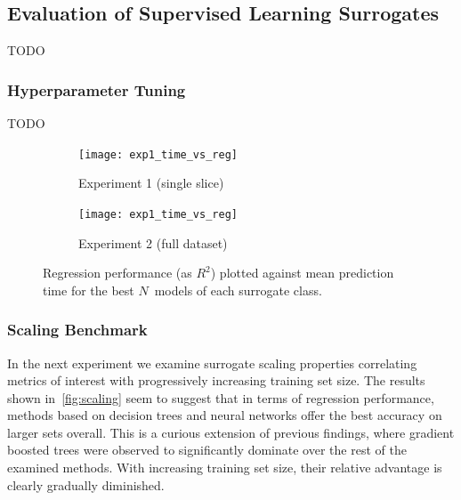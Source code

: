 \subsection{Evaluation of Supervised Learning Surrogates}
\label{sec:modelres}

TODO

\subsubsection{Hyperparameter Tuning}

TODO

\begin{figure}[h]
	\centering
	\begin{subfigure}[b]{0.5\textwidth}
		\centering
		\texttt{[image: exp1\_time\_vs\_reg]}
		\caption{Experiment 1 (single slice)}
	\end{subfigure}\hfill%
	\begin{subfigure}[b]{0.5\textwidth}
		\centering
		\texttt{[image: exp1\_time\_vs\_reg]}
		\caption{Experiment 2 (full dataset)}
	\end{subfigure}
	\caption{Regression performance (as $R^2$) plotted against mean
	prediction time for the best $N$~models of each surrogate class.} %
	\label{fig:time-vs-reg}
\end{figure}


\subsubsection{Scaling Benchmark}

In the next experiment we examine surrogate scaling properties correlating
metrics of interest with progressively increasing training set size. The results
shown in~\cref{fig:scaling} seem to suggest that in terms of regression performance,
methods based on decision trees and neural networks offer the best accuracy on
larger sets overall. This is a curious extension of previous findings, where
gradient boosted trees were observed to significantly dominate over the rest of
the examined methods. With increasing training set size, their relative advantage is
clearly gradually diminished.

